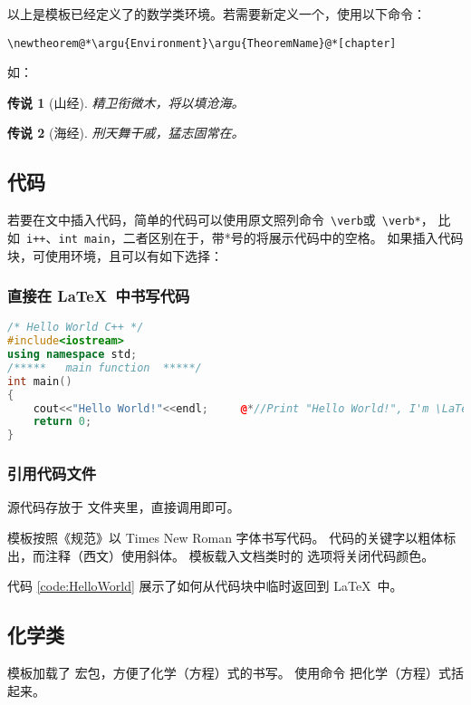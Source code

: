 以上是模板已经定义了的数学类环境。若需要新定义一个，使用以下命令：
\begin{lstlisting}[numbers=none]
\newtheorem@*\argu{Environment}\argu{TheoremName}@*[chapter]
		\end{lstlisting}
如：
\newtheorem{tale}{传说}[chapter]	%
\begin{tale}[山经]	  %
	精卫衔微木，将以填沧海。
\end{tale}
\begin{tale}[海经]
	刑天舞干戚，猛志固常在。
\end{tale}



\subsection{代码}\label{subsec:code}
若要在文中插入代码，简单的代码可以使用原文照列命令~\verb+\verb+或~\verb*@\verb*@，
比如~\verb-i++-、\verb*|int main|，二者区别在于，带*号的将展示代码中的空格。
如果插入代码块，可使用环境，且可以有如下选择：
\subsubsection{直接在 \LaTeX\ 中书写代码}
\begin{lstlisting}[language=C++,caption=Hello World!,label=code:HelloWorld]
/* Hello World C++ */
#include<iostream>
using namespace std;
/*****   main function	*****/
int main()
{
	cout<<"Hello World!"<<endl;		@*//Print "Hello World!", I'm \LaTeX{}！@*
	return 0;
}
\end{lstlisting}
\subsubsection{引用代码文件}
源代码存放于  文件夹里，直接调用即可。


模板按照《规范》以 Times New Roman 字体书写代码。
代码的关键字以粗体标出，而注释（西文）使用斜体。
模板载入文档类时的  选项将关闭代码颜色。

代码 \ref{code:HelloWorld} 展示了如何从代码块中临时返回到 \LaTeX\ 中。


\subsection{化学类}
模板加载了  宏包，方便了化学（方程）式的书写。
使用命令  把化学（方程）式括起来。
